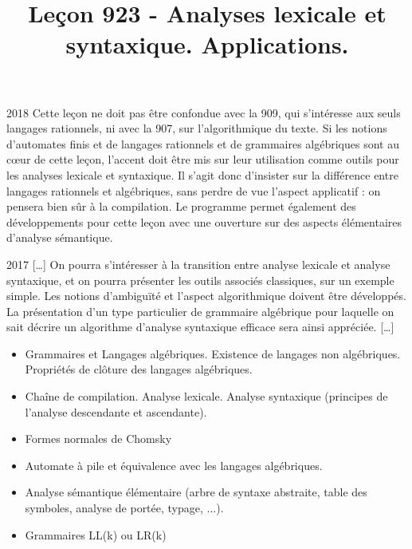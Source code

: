 \documentclass{agregfiche}
\title{Leçon 923 - Analyses lexicale et syntaxique. Applications.}
\begin{document}
\maketitle

\secrapports
\begin{rapport}{2018}
    Cette leçon ne doit pas être confondue avec la 909, qui s’intéresse aux seuls langages rationnels, ni avec
    la 907, sur l’algorithmique du texte.
    Si les notions d’automates finis et de langages rationnels et de grammaires algébriques sont au cœur
    de cette leçon, l’accent doit être mis sur leur utilisation comme outils pour les analyses lexicale et
    syntaxique. Il s’agit donc d’insister sur la différence entre langages rationnels et algébriques, sans perdre
    de vue l’aspect applicatif : on pensera bien sûr à la compilation. Le programme permet également des
    développements pour cette leçon avec une ouverture sur des aspects élémentaires d’analyse sémantique.
\end{rapport}

\begin{rapport}{2017}
[\dots]    On pourra s’intéresser à la transition entre analyse lexicale et analyse syntaxique, et on pourra présenter les outils associés classiques, sur un exemple
    simple. Les notions d’ambiguïté et l’aspect algorithmique doivent être développés. La présentation
    d’un type particulier de grammaire algébrique pour laquelle on sait décrire un algorithme d’analyse
    syntaxique efficace sera ainsi appréciée. [\dots]
    \end{rapport}

\secindispensables

\begin{itemize}
	\item Grammaires et Langages algébriques. Existence de langages non algébriques. Propriétés de clôture
    des langages algébriques.
    \item Chaîne de compilation. Analyse lexicale. Analyse syntaxique (principes de l’analyse descendante
    et ascendante). 
\end{itemize}

\secasavoir

\begin{itemize}
    \item Formes normales de Chomsky
	\item Automate à pile et équivalence avec les langages algébriques.
    \item Analyse sémantique élémentaire (arbre de syntaxe abstraite, table des symboles,
    analyse de portée, typage, ...).
    \item Grammaires LL(k) ou LR(k)
\end{itemize}
\end{document}
